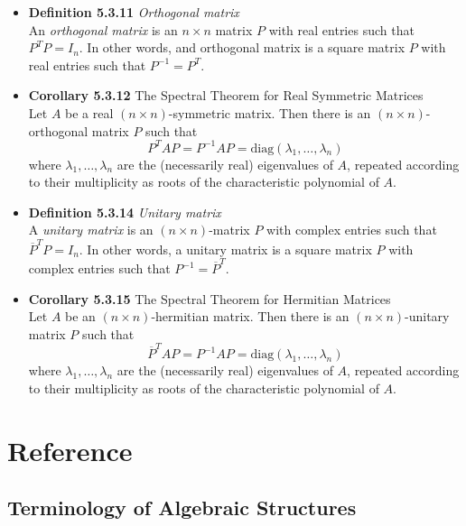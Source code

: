 \documentclass[11pt,a4paper]{article}
\begin{document}
\begin{itemize}
    \item \textbf{Definition 5.3.11} \emph{Orthogonal matrix} \\
        An \emph{orthogonal matrix} is an $n \times n$ matrix $P$ with real entries
        such that $P^T P = I_n$.
        In other words, and orthogonal matrix is a square matrix $P$ with real entries such
        that $P^{-1} = P^T$.

    \item \textbf{Corollary 5.3.12} The Spectral Theorem for Real Symmetric Matrices \\
        Let $A$ be a real $(n \times n)$-symmetric matrix.
        Then there is an $(n \times n)$-orthogonal matrix $P$ such that
        \[
            P^T AP = P^{-1} AP = \mathrm{diag}(\lambda_1, \ldots, \lambda_n)
        \]
        where $\lambda_1, \ldots, \lambda_n$ are the (necessarily real) eigenvalues of $A$,
        repeated according to their multiplicity as roots of the characteristic polynomial of
        $A$.

    \item \textbf{Definition 5.3.14} \emph{Unitary matrix} \\
        A \emph{unitary matrix} is an $(n \times n)$-matrix $P$ with complex entries such that
        $\overline{P}^T P = I_n$.
        In other words, a unitary matrix is a square matrix $P$ with complex entries such that
        $P^{-1} = \overline{P}^T$.

    \item \textbf{Corollary 5.3.15} The Spectral Theorem for Hermitian Matrices \\
        Let $A$ be an $(n \times n)$-hermitian matrix.
        Then there is an $(n \times n)$-unitary matrix $P$ such that
        \[
            \overline{P}^T AP = P^{-1} AP = \mathrm{diag}(\lambda_1, \ldots, \lambda_n)
        \]
        where $\lambda_1, \ldots, \lambda_n$ are the (necessarily real) eigenvalues of $A$,
        repeated according to their multiplicity as roots of the characteristic polynomial of
        $A$.

\end{itemize}

\section{Reference}

\subsection{Terminology of Algebraic Structures}
\end{document}
